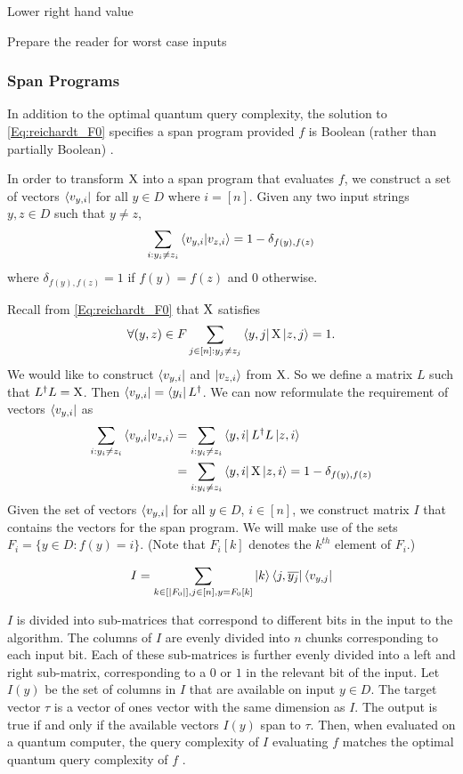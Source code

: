 Lower right hand value

Prepare the reader for worst case inputs

\subsubsection{Span Programs}
In addition to the optimal quantum query complexity,
the solution to \cref{Eq:reichardt_F0} specifies
a span program provided $f$ is Boolean (rather than
partially Boolean) \cite{reichardt2009span}.

In order to transform $\operatorname{X}$ into a span program that
evaluates $f$, we construct a set of vectors
$\bra{v_{y,i}}$ for all $y \in D$ where $i = [n]$.
Given any two input strings $y, z \in D$ such that $y\neq z$,
\begin{align}
    \sum_{i: y_i \ne z_i} \braket{v_{y,i}|v_{z,i}} = 1 - \delta_{f(y), f(z)}
    \nonumber
\end{align}
where $\delta_{f(y), f(z)} = 1$ if $f(y) = f(z)$ and $0$ otherwise.

Recall from \cref{Eq:reichardt_F0} that $\operatorname{X}$ satisfies
\begin{align}
    \forall (y,z) \in F \sum_{j \in [n]: y_j \ne z_j} 
    \bra{y,j} \operatorname{X} \ket{z, j} = 1 \nonumber.
\end{align}
We would like to construct $\bra{v_{y,i}}$ and $\ket{v_{z,i}}$
from $\operatorname{X}$.
So we define a matrix $L$ such that $L^\dagger L = \operatorname{X}$.
Then $\bra{v_{y,i}} = \bra{y_i}L^\dagger$.
We can now reformulate the requirement of vectors $\bra{v_{y,i}}$
as
\begin{align}
    \sum_{i: y_i \ne z_i} \braket{v_{y,i}|v_{z,i}} &= \sum_{i: y_i \ne z_i}
    \bra{y,i} L^\dagger L \ket{z, i} \nonumber \\
    &= \sum_{i: y_i \ne z_i} \bra{y,i} \operatorname{X} \ket{z, i} = 
    1 - \delta_{f(y), f(z)}
    \nonumber
\end{align}
Given the set of vectors $\bra{v_{y,i}}$ for all $y \in
D$, $i \in [n]$, we construct 
matrix $I$ that contains the vectors for the span
program. We will make use of the sets $F_i =
\{y \in D: f(y) = i\}$.
(Note that $F_i[k]$ denotes the $k^{th}$ element of $F_i$.)

\begin{align}\label{input_vectors}
    I = \sum_{k \in [|F_0|], j \in [n], y = F_0[k]}
    \ket{k}\bra{j, \overline{y_j}} \bra{v_{y,j}}
    \nonumber
\end{align}

$I$ is divided into sub-matrices that
correspond to different bits in the input to the
algorithm.
The columns of $I$ are evenly divided into
$n$ chunks corresponding to each input bit.
Each of these sub-matrices is further evenly divided into a left and
right sub-matrix, corresponding to a $0$ or $1$
in the relevant bit of the input.
Let $I(y)$ be the set of columns in 
$I$ that are available on input $y \in D$.
The target vector $\tau$ 
is a vector of ones vector with the same 
dimension as $I$.
The output is true if and only if the available
vectors $I(y)$ span to $\tau$.
Then, when evaluated on a quantum computer,
the query complexity of $I$ evaluating $f$ matches
the optimal quantum query complexity of $f$
\cite{reichardt2009span}.


